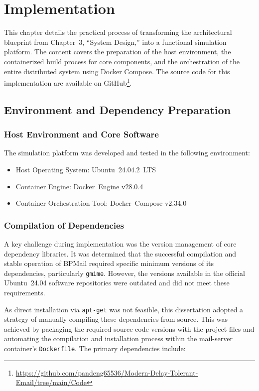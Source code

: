 \chapter{Implementation}
This chapter details the practical process of transforming the architectural blueprint from Chapter~3, ``System Design,'' into a functional simulation platform. The content covers the preparation of the host environment, the containerized build process for core components, and the orchestration of the entire distributed system using Docker Compose. The source code for this implementation are available on GitHub\footnote{\url{https://github.com/pandeng65536/Modern-Delay-Tolerant-Email/tree/main/Code}}.

\section{Environment and Dependency Preparation}

\subsection*{Host Environment and Core Software}
The simulation platform was developed and tested in the following environment:

\begin{itemize}
    \item Host Operating System: Ubuntu~24.04.2~LTS
    \item Container Engine: Docker~Engine v28.0.4
    \item Container Orchestration Tool: Docker~Compose v2.34.0
\end{itemize}

\subsection*{Compilation of Dependencies}
A key challenge during implementation was the version management of core dependency libraries. It was determined that the successful compilation and stable operation of BPMail required specific minimum versions of its dependencies, particularly \texttt{gmime}. However, the versions available in the official Ubuntu~24.04 software repositories were outdated and did not meet these requirements.

As direct installation via \texttt{apt-get} was not feasible, this dissertation adopted a strategy of manually compiling these dependencies from source. This was achieved by packaging the required source code versions with the project files and automating the compilation and installation process within the mail-server container's \texttt{Dockerfile}. The primary dependencies include:

